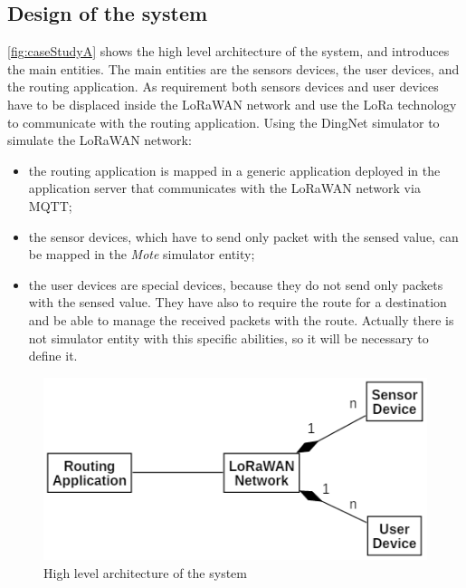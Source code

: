 \subsection{Design of the system}
\autoref{fig:caseStudyA} shows the high level architecture of the system, and introduces the main entities. 
The main entities are the sensors devices, the user devices, and the routing application.
As requirement both sensors devices and user devices have to be displaced inside the LoRaWAN network and use the LoRa technology to communicate with the routing application.
Using the DingNet simulator to simulate the LoRaWAN network:
\begin{itemize}
    \item the routing application is mapped in a generic application deployed in the application server that communicates with the LoRaWAN network via MQTT;
    \item the sensor devices, which have to send only packet with the sensed value, can be mapped in the \textit{Mote} simulator entity;
    \item the user devices are special devices, because they do not send only packets with the sensed value. They have also to require the route for a destination and be able to manage the received packets with the route. Actually there is not simulator entity with this specific abilities, so it will be necessary to define it.
\end{itemize}
% 
\begin{figure}[h]
    \centering
    \includegraphics{figures/CaseStudyA_HLarch.png}
    \caption{High level architecture of the system}
    \label{fig:caseStudyA}
\end{figure}
% 

